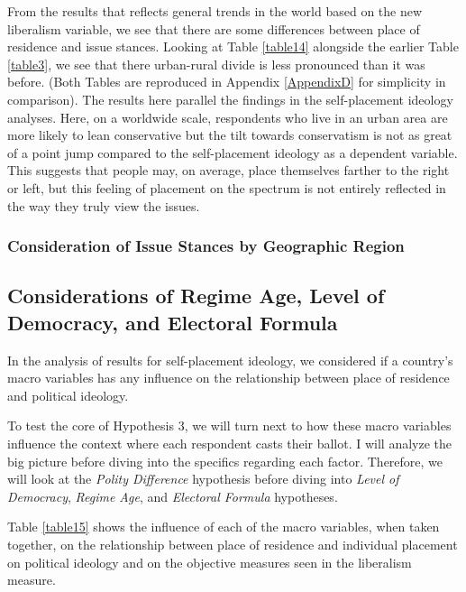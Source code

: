 \documentclass[12pt, titlepage]{article}
\newcommand\e{\emph}
\begin{document}
From the results that reflects general trends in the world based on the new liberalism variable, we see that there are some differences between place of residence and issue stances. Looking at Table \ref{table14} alongside the earlier Table \ref{table3}, we see that there urban-rural divide is less pronounced than it was before. (Both Tables are reproduced in Appendix \ref{AppendixD} for simplicity in comparison). The results here parallel the findings in the self-placement ideology analyses. Here, on a worldwide scale, respondents who live in an urban area are more likely to lean conservative but the tilt towards conservatism is not as great of a point jump compared to the self-placement ideology as a dependent variable. This suggests that people may, on average, place themselves farther to the right or left, but this feeling of placement on the spectrum is not entirely reflected in the way they truly view the issues.

\subsubsection{Consideration of Issue Stances by Geographic Region}



\subsection{Considerations of Regime Age, Level of Democracy, and Electoral Formula}

In the analysis of results for self-placement ideology, we considered if a country's macro variables has any influence on the relationship between place of residence and political ideology.

To test the core of Hypothesis 3, we will turn next to how these macro variables influence the context where each respondent casts their ballot. I will analyze the big picture before diving into the specifics regarding each factor. Therefore, we will look at the \e{Polity Difference} hypothesis before diving into \e{Level of Democracy}, \e{Regime Age}, and \e{Electoral Formula} hypotheses.

Table \ref{table15} shows the influence of each of the macro variables, when taken together, on the relationship between place of residence and individual placement on political ideology and on the objective measures seen in the liberalism measure.
\end{document}
